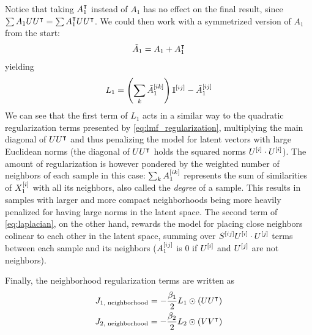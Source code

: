 %
Notice that taking $A_1^\intercal$ instead of $A_1$ has no effect on the final result, since $\sum A_1 UU^\intercal = \sum A_1^\intercal UU^\intercal$. We could then work with a symmetrized version of $A_1$ from the start:
%
\begin{equation*}
    \tilde A_1 = A_1 + A_1^\intercal
\end{equation*}
yielding
%
\begin{equation*}
    L_1 = \left(\sum_k \tilde A_1^{[ik]}\right)
        \mathbb{I}^{[ij]}
        - \tilde A_1^{[ij]} 
\end{equation*}
%
We can see that the first term of $L_1$ acts in a similar way to the quadratic regularization terms presented by \autoref{eq:lmf_regularization}, multiplying the main diagonal of $UU^\intercal$ and thus penalizing the model for latent vectors with large Euclidean norms (the diagonal of $UU^\intercal$ holds the squared norms $U^{[i]}\cdot U^{[i]}$). The amount of regularization is however pondered by the weighted number of neighbors of each sample in this case: $\sum_k A_1^{[ik]}$ represents the sum of similarities of $X_1^{[i]}$ with all its neighbors, also called the \emph{degree} of a sample. This results in samples with larger and more compact neighborhoods being more heavily penalized for having large norms in the latent space. The second term of \autoref{eq:laplacian}, on the other hand, rewards the model for placing close neighbors colinear to each other in the latent space, summing over $S^{[ij]} U^{[i]}\cdot U^{[j]}$ terms
between each sample and its neighbors ($A_1^{[ij]}$ is $0$ if $U^{[i]}$ and $U^{[j]}$ are not neighbors).

Finally, the neighborhood regularization terms are written as
%
\begin{gather}
    J_\text{1, neighborhood} = -\frac{\beta_1}{2} L_1 \odot (UU^\intercal)\\
    J_\text{2, neighborhood} = -\frac{\beta_2}{2} L_2 \odot (VV^\intercal)
\end{gather}
%
%

